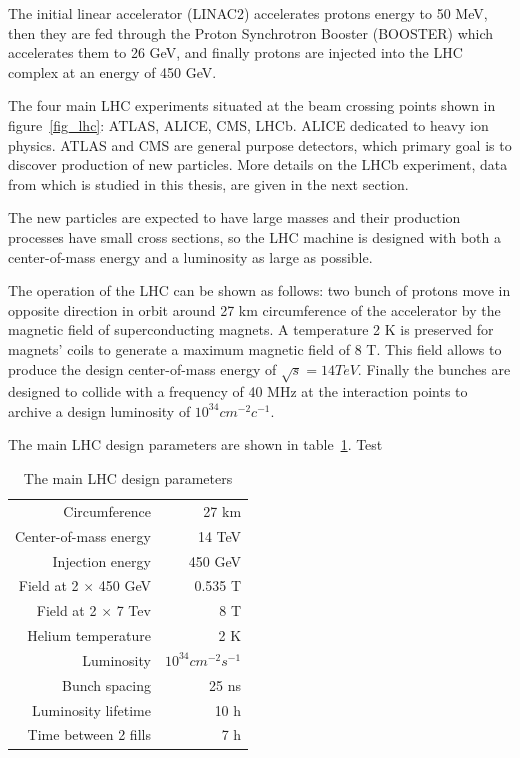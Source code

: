 The initial linear accelerator (LINAC2) accelerates protons energy to 50 MeV,
then they are fed through the Proton Synchrotron Booster (BOOSTER) which
accelerates them to 26 GeV, and finally protons are injected  into the LHC
complex at an energy of 450 GeV.

The four main LHC experiments situated at the beam crossing points shown in
figure~\ref{fig_lhc}: ATLAS, ALICE, CMS, LHCb. ALICE dedicated to heavy ion physics.
ATLAS and CMS are general purpose detectors, which primary goal is to discover
production of new particles. More details on the  LHCb experiment, data from
 which is studied in this thesis, are given in the next section.

The new particles are expected to have large masses and their production
processes have small cross sections, so the LHC machine is designed with both
a center-of-mass energy and a luminosity as large as possible.

The operation of the LHC can be shown as follows: two bunch of protons move in
opposite direction in orbit around 27 km circumference of the accelerator by
the magnetic field of superconducting magnets. A temperature 2 K is preserved
for magnets' coils to generate a maximum magnetic field of 8 T.  This field
allows to produce the design center-of-mass energy of $\sqrt{s}=14 TeV$.
Finally the bunches are designed to collide with a frequency of 40 MHz at the
interaction points to archive a design luminosity of $10^{34}cm^{-2}c^{-1}$.

The main LHC design parameters are shown in table~\ref{tab_lhc}. Test

\begin{table}
    \centering
    \begin{tabular}{||r|r||}
      \hline
        Circumference  &  27 km\\
        Center-of-mass energy &  14 TeV\\
        Injection energy  &  450 GeV\\
        Field at 2 $\times$ 450 GeV  &  0.535 T\\
        Field at 2 $\times$ 7 Tev & 8 T\\
        Helium temperature & 2 K\\
        Luminosity & $10^{34}cm^{-2}s^{-1}$\\
        Bunch spacing  & 25 ns\\
        Luminosity lifetime & 10 h\\
        Time between 2 fills  &  7 h\\
      \hline
    \end{tabular}
    \caption{The main LHC design parameters}
\label{tab_lhc}
\end{table}



